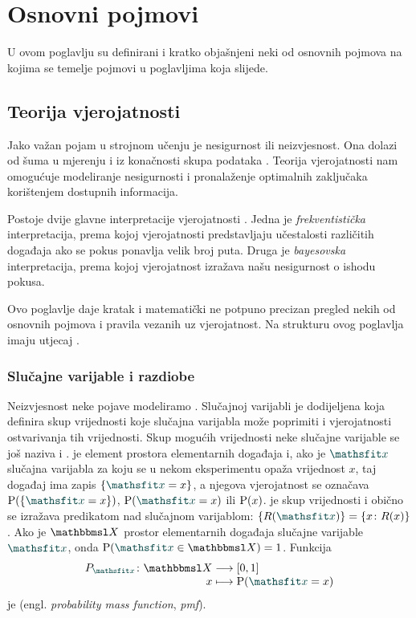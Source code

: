 \documentclass[utf8, diplomski, lmodern]{fer}
\begin{document}
\chapter{Osnovni pojmovi} \label{chap:osnovni-pojmovi}

U ovom poglavlju su definirani i kratko objašnjeni neki od osnovnih pojmova na kojima se temelje pojmovi u poglavljima koja slijede.

\section{Teorija vjerojatnosti}

Jako važan pojam u strojnom učenju je nesigurnost ili neizvjesnost. Ona dolazi od šuma u mjerenju i iz konačnosti skupa podataka \citep{Bishop:2006:PRML}. Teorija vjerojatnosti nam omogućuje modeliranje nesigurnosti i pronalaženje optimalnih zaključaka korištenjem dostupnih informacija.

Postoje dvije glavne interpretacije vjerojatnosti \citep{Murphy:2012:MLPP}. Jedna je \textit{frekventistička} interpretacija, prema kojoj vjerojatnosti predstavljaju učestalosti različitih događaja ako se pokus ponavlja velik broj puta. Druga je \textit{bayesovska} interpretacija, prema kojoj vjerojatnost izražava našu nesigurnost o ishodu pokusa. 
 
Ovo poglavlje daje kratak i matematički ne potpuno precizan pregled nekih od osnovnih pojmova i pravila vezanih uz vjerojatnost. Na strukturu ovog poglavlja imaju utjecaj \citet{Goodfellow:2016:DL,Murphy:2012:MLPP}.

\subsection{Slučajne varijable i razdiobe}

Neizvjesnost neke pojave modeliramo . Slučajnoj varijabli je dodijeljena  koja definira skup vrijednosti koje slučajna varijabla može poprimiti i vjerojatnosti ostvarivanja tih vrijednosti. Skup mogućih vrijednosti neke slučajne varijable se još naziva i .  je element prostora elementarnih događaja i, ako je $\rvar x$ slučajna varijabla za koju se u nekom eksperimentu opaža vrijednost $x$, taj događaj ima zapis $\cbr{\rvar x = x}$, a njegova vjerojatnost se označava $\P(\cbr{\rvar x = x})$, $\P(\rvar x = x)$ ili $\P(x)$.  je skup vrijednosti i obično se izražava predikatom nad slučajnom varijablom: $\cbr{R(\rvar x)}=\cbr{x\colon R(x)}$. Ako je $\set X$ prostor elementarnih događaja slučajne varijable $\rvar x$, onda $\P(\rvar x\in \set X)=1$. Funkcija 
\begin{align*}
\fullfunction{P_{\rvar x}}{\set X}{\intcc{0,1}}{x}{\P(\rvar x=x)}
\end{align*}
je  (engl. \textit{probability mass function}, \textit{pmf}).
\end{document}
